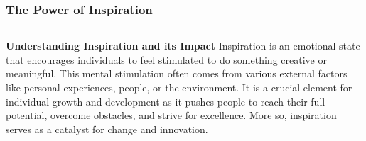 \documentclass[5pt]{beamer}
\begin{document}
\begin{frame}
\frametitle{The Power of Inspiration}
\begin{columns}
\begin{column}{0.7\textwidth}
\begin{block}{\textbf{Understanding Inspiration and its Impact}}
Inspiration is an emotional state that encourages individuals to feel stimulated to do something creative or meaningful. This mental stimulation often comes from various external factors like personal experiences, people, or the environment. It is a crucial element for individual growth and development as it pushes people to reach their full potential, overcome obstacles, and strive for excellence. More so, inspiration serves as a catalyst for change and innovation.
\end{block}
\end{column}
\end{columns}
\end{frame}
\end{document}
